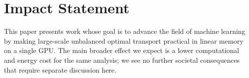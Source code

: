 \documentclass{article}
\theoremstyle{definition}
\theoremstyle{plain}
\begin{document}

\printAffiliationsAndNotice{}


\newpage
\section*{Impact Statement}
This paper presents work whose goal is to advance the field of machine learning by making large-scale unbalanced optimal transport practical in linear memory on a single GPU.
The main broader effect we expect is a lower computational and energy cost for the same analysis; we see no further societal consequences that require separate discussion here.



\newpage
\appendix
\onecolumn

\end{document}
